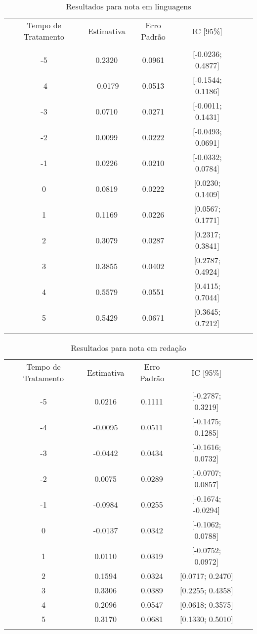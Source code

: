 \documentclass[
        12pt,                           %
        openright,                      %
        oneside,
        a4paper,                        %
        chapter=TITLE,         %
        section=TITLE,         %
        subsection=Title,      %
        english,                        %
        spanish,                        %
        portugues,                      %
        ]{abntex2}
\begin{document}
{\begin{apendicesenv}
\begin{table}[htbp]
\caption{Resultados para nota em linguagens}
\centering
\begin{tabular}{cccccc}
\\ \hline
Tempo de Tratamento & Estimativa & Erro Padrão & IC [95\%] \\
\\ \hline
-5 & 0.2320 & 0.0961 & [-0.0236; 0.4877] \\
-4 & -0.0179 & 0.0513 & [-0.1544; 0.1186] \\
-3 & 0.0710 & 0.0271 & [-0.0011; 0.1431] \\
-2 & 0.0099 & 0.0222 & [-0.0493; 0.0691] \\
-1 & 0.0226 & 0.0210 & [-0.0332; 0.0784] \\
0 & 0.0819 & 0.0222 & [0.0230; 0.1409] \\
1 & 0.1169 & 0.0226 & [0.0567; 0.1771] \\
2 & 0.3079 & 0.0287 & [0.2317; 0.3841] \\
3 & 0.3855 & 0.0402 & [0.2787; 0.4924] \\
4 & 0.5579 & 0.0551 & [0.4115; 0.7044] \\
5 & 0.5429 & 0.0671 & [0.3645; 0.7212] \\
\\ \hline
\end{tabular}
\label{tab:resultados_linguagens}
\end{table}

\begin{table}[htbp]
\caption{Resultados para nota em redação}
\centering
\begin{tabular}{cccccc}
\\ \hline
Tempo de Tratamento & Estimativa & Erro Padrão & IC [95\%] \\
\\ \hline
-5 & 0.0216 & 0.1111 & [-0.2787; 0.3219] \\
-4 & -0.0095 & 0.0511 & [-0.1475; 0.1285] \\
-3 & -0.0442 & 0.0434 & [-0.1616; 0.0732] \\
-2 & 0.0075 & 0.0289 & [-0.0707; 0.0857] \\
-1 & -0.0984 & 0.0255 & [-0.1674; -0.0294] \\
0 & -0.0137 & 0.0342 & [-0.1062; 0.0788] \\
1 & 0.0110 & 0.0319 & [-0.0752; 0.0972] \\
2 & 0.1594 & 0.0324 & [0.0717; 0.2470] \\
3 & 0.3306 & 0.0389 & [0.2255; 0.4358] \\
4 & 0.2096 & 0.0547 & [0.0618; 0.3575] \\
5 & 0.3170 & 0.0681 & [0.1330; 0.5010] \\
\\ \hline
\end{tabular}
\label{tab:resultados_redacao}
\end{table}


\end{apendicesenv}}
\end{document}
